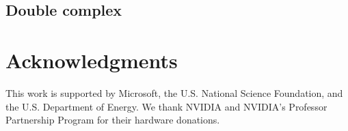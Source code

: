 \documentclass[10pt]{book}
\begin{document}
\newpage
\section{Double complex}






\chapter*{Acknowledgments}
This work is supported by Microsoft, the U.S. National Science Foundation,
and the U.S. Department of Energy. We thank NVIDIA and NVIDIA's Professor 
Partnership Program for their hardware donations.




\end{document}
